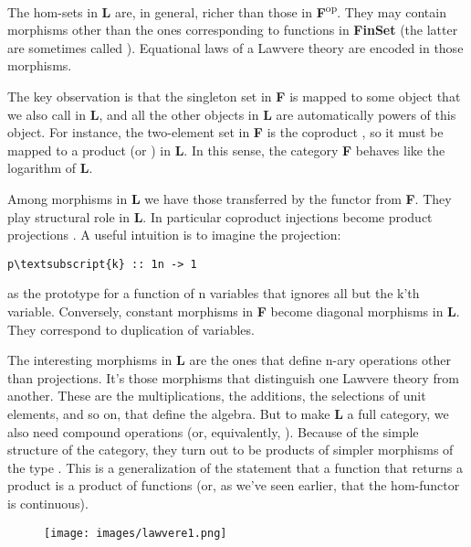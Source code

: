The hom-sets in \textbf{L} are, in general, richer than those in
\textbf{F}\textsuperscript{op}. They may contain morphisms other than
the ones corresponding to functions in \textbf{FinSet} (the latter are
sometimes called ). Equational laws of a
Lawvere theory are encoded in those morphisms.

The key observation is that the singleton set  in \textbf{F}
is mapped to some object that we also call  in \textbf{L}, and
all the other objects in \textbf{L} are automatically powers of this
object. For instance, the two-element set  in \textbf{F} is
the coproduct , so it must be mapped to a product
 (or ) in \textbf{L}. In this sense, the category
\textbf{F} behaves like the logarithm of \textbf{L}.

Among morphisms in \textbf{L} we have those transferred by the functor
 from \textbf{F}. They play structural role in \textbf{L}. In
particular coproduct injections  become product projections
. A useful intuition is to imagine the projection:

\begin{Verbatim}[commandchars=\\\{\}]
p\textsubscript{k} :: 1n -> 1
\end{Verbatim}
as the prototype for a function of n variables that ignores all but the
k'th variable. Conversely, constant morphisms 
in \textbf{F} become diagonal morphisms  in
\textbf{L}. They correspond to duplication of variables.

The interesting morphisms in \textbf{L} are the ones that define n-ary
operations other than projections. It's those morphisms that distinguish
one Lawvere theory from another. These are the multiplications, the
additions, the selections of unit elements, and so on, that define the
algebra. But to make \textbf{L} a full category, we also need compound
operations  (or, equivalently,
). Because of the simple structure of
the category, they turn out to be products of simpler morphisms of the
type . This is a generalization of the
statement that a function that returns a product is a product of
functions (or, as we've seen earlier, that the hom-functor is
continuous).

\begin{figure}[H]
\centering
\texttt{[image: images/lawvere1.png]}
\end{figure}

